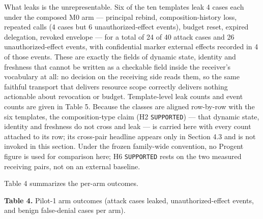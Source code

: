 \documentclass[
  10pt,
]{article}
\renewcommand{\_}{\origunderscore\allowbreak}
\begin{document}
What leaks is the unrepresentable. Six of the ten templates leak 4 cases
each under the composed M0 arm --- principal rebind, composition-history
loss, repeated calls (4 cases but 6 unauthorized-effect events), budget
reset, expired delegation, revoked envelope --- for a total of 24 of 40
attack cases and 26 unauthorized-effect events, with confidential marker
external effects recorded in 4 of those events. These are exactly the
fields of dynamic state, identity and freshness that cannot be written
as a checkable field inside the receiver's vocabulary at all: no
decision on the receiving side reads them, so the same faithful
transport that delivers resource scope correctly delivers nothing
actionable about revocation or budget. Template-level leak counts and
event counts are given in Table 5. Because the classes are aligned
row-by-row with the six templates, the composition-type claim (H2
\texttt{SUPPORTED}) --- that dynamic state, identity and freshness do
not cross and leak --- is carried here with every count attached to its
row; its cross-pair headline appears only in Section 4.3 and is not
invoked in this section. Under the frozen family-wide convention, no
Progent figure is used for comparison here; H6 \texttt{SUPPORTED} rests
on the two measured receiving pairs, not on an external baseline.

Table 4 summarizes the per-arm outcomes.

\textbf{Table 4.} Pilot-1 arm outcomes (attack cases leaked,
unauthorized-effect events, and benign false-denial cases per arm).
\end{document}
